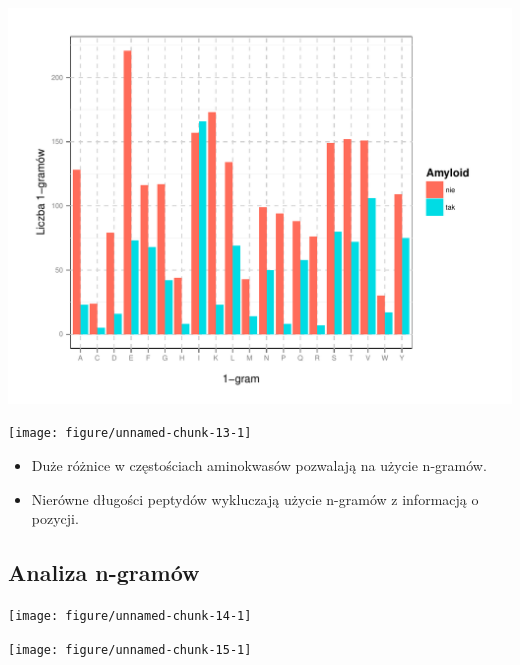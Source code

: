 \documentclass[10pt]{beamer}\usepackage[]{graphicx}\usepackage[]{color}
\makeatletter
\def\maxwidth{ %
  \ifdim\Gin@nat@width>\linewidth
    \linewidth
  \else
    \Gin@nat@width
  \fi
}
\makeatother
\begin{document}
\begin{frame}



\includegraphics[width=\maxwidth]{figure/unnamed-chunk-12-1} 


\end{frame}


\begin{frame}


\texttt{[image: figure/unnamed-chunk-13-1]} 


\end{frame}


\begin{frame}

\begin{itemize}
\item Duże różnice w częstościach aminokwasów pozwalają na użycie n-gramów.
\item Nierówne długości peptydów wykluczają użycie n-gramów z informacją o pozycji.
\end{itemize}

\end{frame}



\subsection{Analiza n-gramów}

\begin{frame}

\texttt{[image: figure/unnamed-chunk-14-1]} 


\end{frame}


\begin{frame}


\texttt{[image: figure/unnamed-chunk-15-1]} 


\end{frame}


\begin{frame}

\tiny{
      
      
    }


\end{frame}
\end{document}
